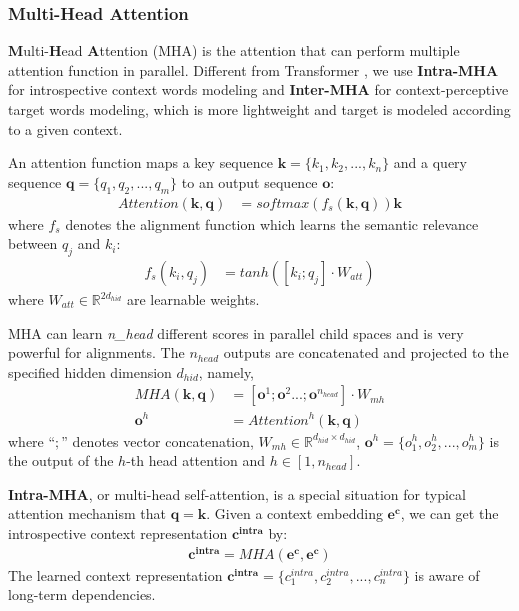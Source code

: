 \documentclass[11pt,a4paper]{article}
\begin{document}
\subsubsection{Multi-Head Attention} \label{sec:MHA}

\textbf{M}ulti-\textbf{H}ead \textbf{A}ttention (MHA) is the attention that can perform multiple attention function in parallel.
Different from Transformer \cite{vaswani2017attention}, we use \textbf{Intra-MHA} for introspective context words modeling
and \textbf{Inter-MHA} for context-perceptive target words modeling, which is more lightweight and target is modeled according to a given context.

An attention function maps a key sequence $\mathbf{k} = \{k_1, k_2, ..., k_n\}$ and
a query sequence $\mathbf{q} = \{q_1, q_2, ..., q_m\}$ to an output sequence $\mathbf{o}$:
\begin{align}
Attention(\mathbf{k}, \mathbf{q}) &= softmax(f_{s}(\mathbf{k}, \mathbf{q})) \mathbf{k}
\end{align}
where $f_{s}$ denotes the alignment function which learns the semantic relevance between $q_j$ and $k_i$:
\begin{align}
f_{s}(k_i, q_j) &= tanh([k_i; q_j] \cdot W_{att})
\end{align}
where $W_{att} \in \mathbb{R}^{2d_{hid}}$ are learnable weights.

MHA can learn \emph{n\_head} different scores in parallel child spaces and is very powerful for alignments.
The $n_{head}$ outputs are concatenated and projected to the specified hidden dimension $d_{hid}$, namely,
\begin{align}
MHA(\mathbf{k}, \mathbf{q}) &= [\mathbf{o}^1; \mathbf{o}^2...; \mathbf{o}^{n_{head}}] \cdot W_{mh} \\
\mathbf{o}^h &= Attention^h(\mathbf{k}, \mathbf{q})
\end{align}
where ``$;$'' denotes vector concatenation, $W_{mh} \in \mathbb{R}^{d_{hid} \times d_{hid}}$,
$\mathbf{o}^h = \{o_1^h, o_2^h, ..., o_m^h\}$ is the output of the $h$-th head attention and $h \in [1, n_{head}]$.


\textbf{Intra-MHA}, or multi-head self-attention,
is a special situation for typical attention mechanism that $\mathbf{q} = \mathbf{k}$.
Given a context embedding $\mathbf{e^c}$, we can get the introspective context representation $\mathbf{c^{intra}}$ by:
\begin{align}
\mathbf{c^{intra}} = MHA(\mathbf{e^c}, \mathbf{e^c})
\end{align}
The learned context representation
$\mathbf{c^{intra}}=\{c_1^{intra}, c_2^{intra}, ..., c_n^{intra}\}$ is aware of long-term dependencies.
\end{document}
